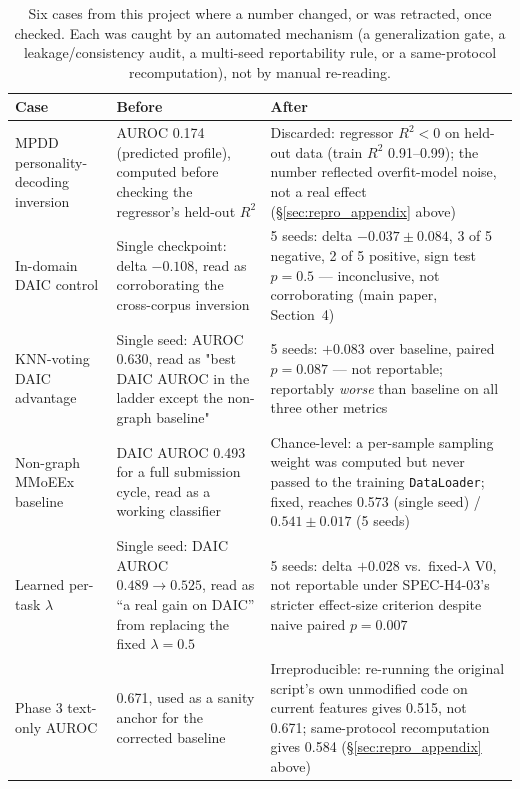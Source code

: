\documentclass[letterpaper]{article}
\begin{document}
\begin{table}[t]
\centering
\caption{Six cases from this project where a number changed, or was retracted, once checked. Each was caught by an automated mechanism (a generalization gate, a leakage/consistency audit, a multi-seed reportability rule, or a same-protocol recomputation), not by manual re-reading.}
\label{tab:reversal_catalogue}
\small
\begin{tabular}{p{}p{}p{}}
\toprule
Case & Before & After \\
\midrule
MPDD personality-decoding inversion & AUROC 0.174 (predicted profile), computed before checking the regressor's held-out $R^2$ & Discarded: regressor $R^2 < 0$ on held-out data (train $R^2$ 0.91--0.99); the number reflected overfit-model noise, not a real effect (\S\ref{sec:repro_appendix} above) \\
In-domain DAIC control & Single checkpoint: delta $-0.108$, read as corroborating the cross-corpus inversion & 5 seeds: delta $-0.037 \pm 0.084$, 3 of 5 negative, 2 of 5 positive, sign test $p{=}0.5$ — inconclusive, not corroborating (main paper, Section~4) \\
KNN-voting DAIC advantage & Single seed: AUROC 0.630, read as "best DAIC AUROC in the ladder except the non-graph baseline" & 5 seeds: $+0.083$ over baseline, paired $p{=}0.087$ — not reportable; reportably \emph{worse} than baseline on all three other metrics \\
Non-graph MMoEEx baseline & DAIC AUROC 0.493 for a full submission cycle, read as a working classifier & Chance-level: a per-sample sampling weight was computed but never passed to the training \texttt{DataLoader}; fixed, reaches 0.573 (single seed) / $0.541\pm0.017$ (5 seeds) \\
Learned per-task $\lambda$ & Single seed: DAIC AUROC $0.489 \to 0.525$, read as ``a real gain on DAIC'' from replacing the fixed $\lambda{=}0.5$ & 5 seeds: delta $+0.028$ vs.\ fixed-$\lambda$ V0, not reportable under SPEC-H4-03's stricter effect-size criterion despite naive paired $p{=}0.007$ \\
Phase 3 text-only AUROC & 0.671, used as a sanity anchor for the corrected baseline & Irreproducible: re-running the original script's own unmodified code on current features gives 0.515, not 0.671; same-protocol recomputation gives 0.584 (\S\ref{sec:repro_appendix} above) \\
\bottomrule
\end{tabular}
\end{table}
\end{document}
